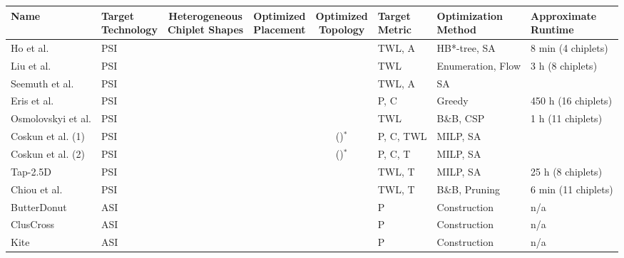 \begin{table*}[h]
\setlength{\tabcolsep}{6.5pt}
\centering
\captionsetup{justification=centering}
\begin{tabular}{llccclll}
\hline
Name & 
\makecell[l]{Target\\Technology} &
\makecell{Heterogeneous\\Chiplet Shapes} &
\makecell{Optimized\\Placement} & 
\makecell{Optimized\\Topology} & 
\makecell[l]{Target\\Metric} &
\makecell[l]{Optimization\\Method} &
\makecell[l]{Approximate\\Runtime}
\\
\midrule

Ho et al. 			\cite{ho}				& PSI			& \cmark	& \cmark	& \xmark		& TWL, A 		& HB*-tree, SA	& 8 min (4 chiplets)	\\		%
Liu et al. 			\cite{liu}				& PSI			& \cmark	& \cmark	& \xmark		& TWL 			& Enumeration, Flow	& 3 h (8 chiplets)	\\		%
Seemuth et al. 		\cite{seemuth}			& PSI			& \cmark	& \cmark	& \xmark		& TWL, A 		& SA			& \qmark 				\\		%
Eris et al. 		\cite{eris}				& PSI			& \xmark	& \cmark	& \xmark		& P, C 			& Greedy 		& 450 h (16 chiplets) 	\\		%
Osmolovskyi et al. 	\cite{osmolovskyi}		& PSI			& \cmark	& \cmark	& \xmark		& TWL 			& B\&B, CSP 	& 1 h  	(11 chiplets) 	\\		%
Coskun et al. (1) 	\cite{coskun-1}			& PSI			& \xmark	& \cmark	& (\cmark)$^*$	& P, C, TWL 	& MILP, SA 		& \qmark				\\		%
Coskun et al. (2) 	\cite{coskun-2}			& PSI			& \xmark	& \cmark	& (\cmark)$^*$	& P, C, T 		& MILP, SA 		& \qmark 				\\		%
Tap-2.5D 			\cite{tap25d}			& PSI			& \cmark	& \cmark	& \xmark		& TWL, T 		& MILP, SA 		& 25 h 	(8 chiplets)  	\\		%
Chiou et al. 		\cite{chiou}			& PSI			& \cmark	& \cmark	& \xmark		& TWL, T 		& B\&B, Pruning	& 6 min (11 chiplets)	\\ 		%

ButterDonut			\cite{butterdonut}		& ASI			& \xmark	& \xmark	& \cmark		& P 			& Construction	& n/a					\\
ClusCross			\cite{cluscross}		& ASI			& \xmark	& \xmark	& \cmark		& P 			& Construction	& n/a					\\
Kite 				\cite{kite}				& ASI			& \xmark	& \xmark	& \cmark		& P 			& Construction	& n/a					\\


\end{tabular}
\end{table*}
